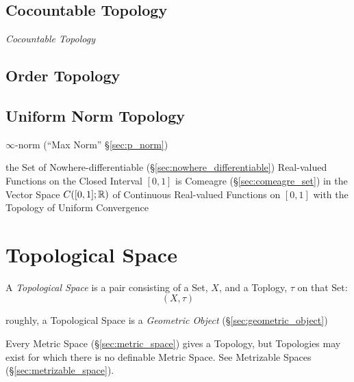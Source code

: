 \subsection{Cocountable Topology}\label{sec:cocountable_topology}

\emph{Cocountable Topology}



\subsection{Order Topology}\label{sec:order_topology}

\subsection{Uniform Norm Topology}\label{sec:uniform_norm_topology}

$\infty$-norm (``Max Norm'' \S\ref{sec:p_norm})

the Set of Nowhere-differentiable (\S\ref{sec:nowhere_differentiable})
Real-valued Functions on the Closed Interval $[0,1]$ is Comeagre
(\S\ref{sec:comeagre_set}) in the Vector Space $C([0,1]; \mathbb{R})$ of Continuous
Real-valued Functions on $[0,1]$ with the Topology of Uniform Convergence



\section{Topological Space}\label{sec:topological_space}

A \emph{Topological Space} is a pair consisting of a Set, $X$, and a
Toplogy, $\tau$ on that Set:
\[
  (X,\tau)
\]

roughly, a Topological Space is a \emph{Geometric Object}
(\S\ref{sec:geometric_object})

Every Metric Space (\S\ref{sec:metric_space}) gives a Topology, but Topologies
may exist for which there is no definable Metric Space. See Metrizable Spaces
(\S\ref{sec:metrizable_space}).

